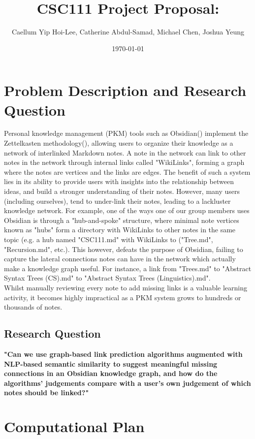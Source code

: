 \documentclass[fontsize=11pt]{article}
\title{CSC111 Project Proposal: }
\author{Caellum Yip Hoi-Lee, Catherine Abdul-Samad, Michael Chen, Joshua Yeung}
\date{\today}
\begin{document}
\maketitle

\section*{Problem Description and Research Question}

Personal knowledge management (PKM) tools such as Obsidian(\cite{obsidian}) implement the Zettelkasten methodology(\cite {zettelkasten_method}), allowing users to organize their knowledge as a network of interlinked Markdown notes. A note in the network can link to other notes in the network through internal links called "WikiLinks", forming a graph where the notes are vertices and the links are edges. The benefit of such a system lies in its ability to provide users with insights into the relationship between ideas, and build a stronger understanding of their notes. However, many users (including ourselves), tend to under-link their notes, leading to a lackluster knowledge network. For example, one of the ways one of our group members uses Obsidian is through a "hub-and-spoke" structure, where minimal note vertices known as "hubs" form a directory with WikiLinks to other notes in the same topic (e.g. a hub named "CSC111.md" with WikiLinks to ("Tree.md", "Recursion.md", etc.). This however, defeats the purpose of Obsidian, failing to capture the lateral connections notes can have in the network which actually make a knowledge graph useful. For instance, a link from "Trees.md" to "Abstract Syntax Trees (CS).md" to "Abstract Syntax Trees (Linguistics).md".\\

\noindent Whilst manually reviewing every note to add missing links is a valuable learning activity, it becomes highly impractical as a PKM system grows to hundreds or thousands of notes.

\subsection*{Research Question}
\textbf{"Can we use graph-based link prediction algorithms augmented with NLP-based semantic similarity to suggest meaningful missing connections in an Obsidian knowledge graph, and how do the algorithms' judgements compare with a user's own judgement of which notes should be linked?"}

\section*{Computational Plan}
\end{document}
